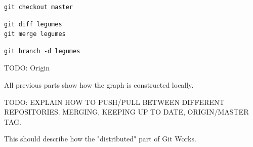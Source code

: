 \documentclass[table,tikz,12pt,svgnames]{beamer}
\begin{document}
\begin{frame}[fragile]
{\begin{figure}
\begin{subfigure}[h]{\textwidth}
\begin{tikzpicture}
			\end{tikzpicture}
		\end{subfigure}
	\end{figure}
}
\vspace{0.4cm} \begin{center} \noindent{} \end{center} \vspace{-0.4cm}

\begin{verbatim}
git checkout master
\end{verbatim}
\pause[2]
\begin{verbatim}
git diff legumes
git merge legumes
\end{verbatim}
\pause
\begin{verbatim}
git branch -d legumes
\end{verbatim}
\end{frame}



\begin{frame}{TODO: Origin}

All previous parts show how the graph is constructed locally.

TODO: EXPLAIN HOW TO PUSH/PULL BETWEEN DIFFERENT REPOSITORIES.
MERGING, KEEPING UP TO DATE, ORIGIN/MASTER TAG.

This should describe how the "distributed" part of Git Works.

\end{frame}

\end{document}
